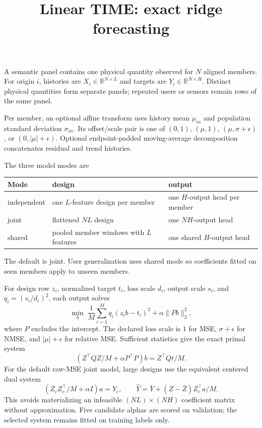 \documentclass[11pt]{article}
\title{Linear TIME: exact ridge forecasting}
\author{}\date{}
\begin{document}
\maketitle\small

A semantic panel contains one physical quantity observed for $N$ aligned
members. For origin $i$, histories are $X_i\in\mathbb R^{N\times L}$ and
targets are $Y_i\in\mathbb R^{N\times H}$. Distinct physical quantities form
separate panels; repeated users or sensors remain rows of the same panel.

Per member, an optional affine transform uses history mean $\mu_{in}$ and
population standard deviation $\sigma_{in}$. Its offset/scale pair is one of
$(0,1)$, $(\mu,1)$, $(\mu,\sigma+\epsilon)$, or
$(0,|\mu|+\epsilon)$. Optional endpoint-padded moving-average decomposition
concatenates residual and trend histories.

The three model modes are
\begin{center}\begin{tabular}{lll}\toprule
Mode & design & output\\\midrule
independent & one $L$-feature design per member & one $H$-output head per member\\
joint & flattened $N L$ design & one $N H$-output head\\
shared & pooled member windows with $L$ features & one shared $H$-output head\\
\bottomrule\end{tabular}\end{center}
The default is joint. User generalization uses shared mode so coefficients
fitted on seen members apply to unseen members.

For design row $z_i$, normalized target $t_i$, loss scale $d_i$, output scale
$s_i$, and $q_i=(s_i/d_i)^2$, each output solves
\[
 \min_b\;\frac1M\sum_{i=1}^M q_i(z_i b-t_i)^2+\alpha\|Pb\|_2^2,
\]
where $P$ excludes the intercept. The declared loss scale is $1$ for MSE,
$\sigma+\epsilon$ for NMSE, and $|\mu|+\epsilon$ for relative MSE. Sufficient
statistics give the exact primal system
\[
 (Z^\top QZ/M+\alpha P^\top P)b=Z^\top Qt/M.
\]
For the default raw-MSE joint model, large designs use the equivalent centered
dual system
\[
 (Z_cZ_c^\top/M+\alpha I)a=Y_c,\qquad
 \widehat Y=\bar Y+(Z-\bar Z)Z_c^\top a/M.
\]
This avoids materializing an infeasible $(NL)\times(NH)$ coefficient matrix
without approximation. Five candidate alphas are scored on validation; the
selected system remains fitted on training labels only.
\end{document}
